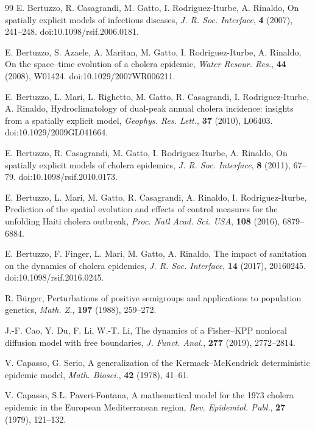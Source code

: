 \documentclass[a4paper,11pt]{amsart}
\theoremstyle{definition}
\numberwithin{equation}{section}
\theoremstyle{definition}
\begin{document}
\begin{thebibliography}{99}
E. Bertuzzo, R. Casagrandi, M. Gatto, I. Rodriguez-Iturbe, A. Rinaldo,
On spatially explicit models of infectious diseases,
\textit{J. R. Soc. Interface}, \textbf{4} (2007), 241--248.
doi:10.1098/rsif.2006.0181.

E. Bertuzzo, S. Azaele, A. Maritan, M. Gatto, I. Rodriguez-Iturbe, A. Rinaldo,
On the space--time evolution of a cholera epidemic,
\textit{Water Resour. Res.}, \textbf{44} (2008), W01424.
doi:10.1029/2007WR006211.




E. Bertuzzo, L. Mari, L. Righetto, M. Gatto, R. Casagrandi, I. Rodriguez-Iturbe, A. Rinaldo,
Hydroclimatology of dual-peak annual cholera incidence: insights from a spatially explicit model,
\textit{Geophys. Res. Lett.}, \textbf{37} (2010), L06403.
doi:10.1029/2009GL041664.

E. Bertuzzo, R. Casagrandi, M. Gatto, I. Rodriguez-Iturbe, A. Rinaldo,
On spatially explicit models of cholera epidemics,
\textit{J. R. Soc. Interface}, \textbf{8} (2011), 67--79.
doi:10.1098/rsif.2010.0173.



E. Bertuzzo, L. Mari, M. Gatto, R. Casagrandi, A. Rinaldo, I. Rodriguez-Iturbe,
Prediction of the spatial evolution and effects of control measures for the unfolding Haiti cholera outbreak,
\textit{Proc. Natl Acad. Sci. USA}, \textbf{108} (2016), 6879--6884.

E. Bertuzzo, F. Finger, L. Mari, M. Gatto, A. Rinaldo,
The impact of sanitation on the dynamics of cholera epidemics,
\textit{J. R. Soc. Interface}, \textbf{14} (2017), 20160245.
doi:10.1098/rsif.2016.0245.

R. Bürger,
Perturbations of positive semigroups and applications to population genetics,
\textit{Math. Z.}, \textbf{197} (1988), 259--272.





J.-F. Cao, Y. Du, F. Li, W.-T. Li,
The dynamics of a Fisher--KPP nonlocal diffusion model with free boundaries,
\textit{J. Funct. Anal.}, \textbf{277} (2019), 2772--2814.

V. Capasso, G. Serio,
A generalization of the Kermack--McKendrick deterministic epidemic model,
\textit{Math. Biosci.}, \textbf{42} (1978), 41--61.

V. Capasso, S.L. Paveri-Fontana,
A mathematical model for the 1973 cholera epidemic in the European Mediterranean region,
\textit{Rev. Epidemiol. Publ.}, \textbf{27} (1979), 121--132.


\end{thebibliography}
\end{document}
